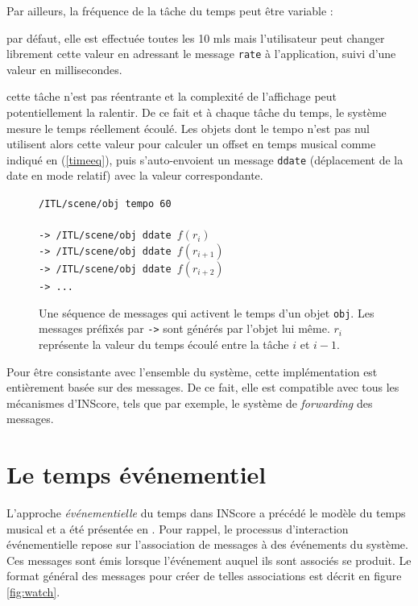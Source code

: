 \documentclass{article}
\newcommand{\OSC}[1]	{{\fontsize{9pt}{9pt} \selectfont\texttt{#1}}}
\let\olditemize\itemize
\let\oldenditemize\enditemize
\renewenvironment{itemize} 	{\olditemize \renewcommand{\labelitemi}{$\bullet$} \setlength{\itemsep}{0mm}}{\oldenditemize}
\newcommand{\sample}[1]		{\vspace{-0.2em}\begin{center}\colorbox{mygrey}{\begin{minipage}[t]{0.98\columnwidth} {\small \texttt{#1}}\end{minipage}}\end{center}}
\begin{document}
Par ailleurs, la fréquence de la tâche du temps peut être variable : 
\begin{itemize}
\item par défaut, elle est effectuée toutes les 10 mls mais l'utilisateur peut changer librement cette valeur en adressant le message \OSC{rate} à l'application, suivi d'une valeur en millisecondes.
\item cette tâche n'est pas réentrante et la complexité de l'affichage peut potentiellement la ralentir.
\end{itemize}
De ce fait et à chaque tâche du temps, le système mesure le temps réellement écoulé. Les objets dont le tempo n'est pas nul utilisent alors cette valeur pour calculer un offset en temps musical comme indiqué en (\ref{timeeq}), puis s'auto-envoient un message \OSC{ddate} (déplacement de la date en mode relatif) avec la valeur correspondante.

\begin{figure}[h]
   \centering
   \sample{/ITL/scene/obj tempo 60 \\
   \\
-> /ITL/scene/obj ddate $f(r_i)$ \\
-> /ITL/scene/obj ddate $f(r_{i+1})$ \\
-> /ITL/scene/obj ddate $f(r_{i+2})$ \\
-> ...
}
   \caption{Une séquence de messages qui activent le temps d'un objet \OSC{obj}. Les messages préfixés par \OSC{->} sont générés par l'objet lui même. $r_{i}$ représente la valeur du temps écoulé entre la tâche $i$ et $i-1$.}
   \label{fig:tempo}
\end{figure}

Pour être consistante avec l'ensemble du système, cette implémentation est entièrement basée sur des messages. De ce fait, elle est compatible avec tous les mécanismes d'INScore, tels que par exemple, le système de \emph{forwarding} des messages. 


\section{Le temps événementiel}\label{evtime}

L'approche \emph{événementielle} du temps dans INScore a précédé le modèle du temps musical et a été présentée en \cite{fober13a}. Pour rappel, le processus d'interaction événementielle repose sur l'association de messages à des événements du système. Ces messages sont émis lorsque l'événement auquel ils sont associés se produit. Le format général des messages pour créer de telles associations est décrit en figure \ref{fig:watch}.
\end{document}

